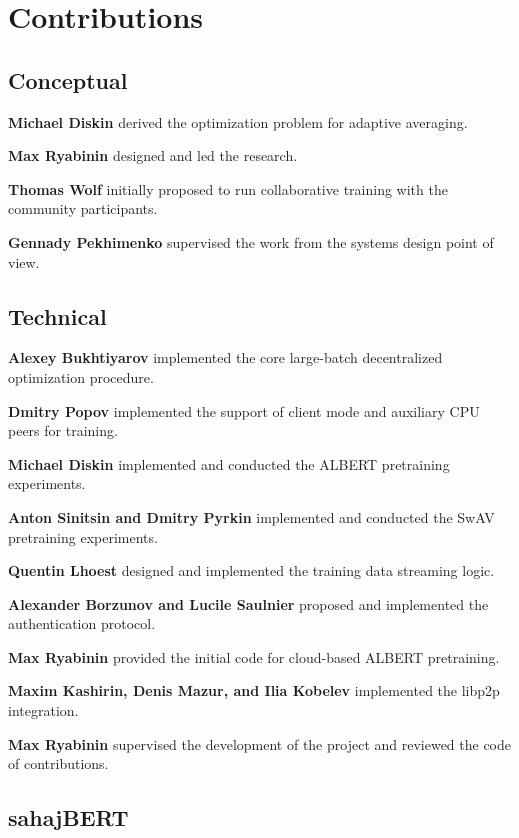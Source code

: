 \section*{Contributions}
\label{sec:contributions}

\vspace{-2pt}
\subsection*{Conceptual}

\textbf{Michael Diskin} derived the optimization problem for adaptive averaging.

\textbf{Max Ryabinin} designed and led the research.

\textbf{Thomas Wolf} initially proposed to run collaborative training with the community participants.

\textbf{Gennady Pekhimenko} supervised the work from the systems design point of view.

\vspace{-2pt}
\subsection*{Technical}

\textbf{Alexey Bukhtiyarov} implemented the core large-batch decentralized optimization procedure. 

\textbf{Dmitry Popov} implemented the support of client mode and auxiliary CPU peers for training.

\textbf{Michael Diskin} implemented and conducted the ALBERT pretraining experiments.

\textbf{Anton Sinitsin and Dmitry Pyrkin} implemented and conducted the SwAV pretraining experiments.

\textbf{Quentin Lhoest} designed and implemented the training data streaming logic.

\textbf{Alexander Borzunov and Lucile Saulnier} proposed and implemented the authentication protocol.

\textbf{Max Ryabinin} provided the initial code for cloud-based ALBERT pretraining.

\textbf{Maxim Kashirin, Denis Mazur, and Ilia Kobelev} implemented the libp2p integration.

\textbf{Max Ryabinin} supervised the development of the project and reviewed the code of contributions.

\vspace{-2pt}
\subsection*{sahajBERT}

